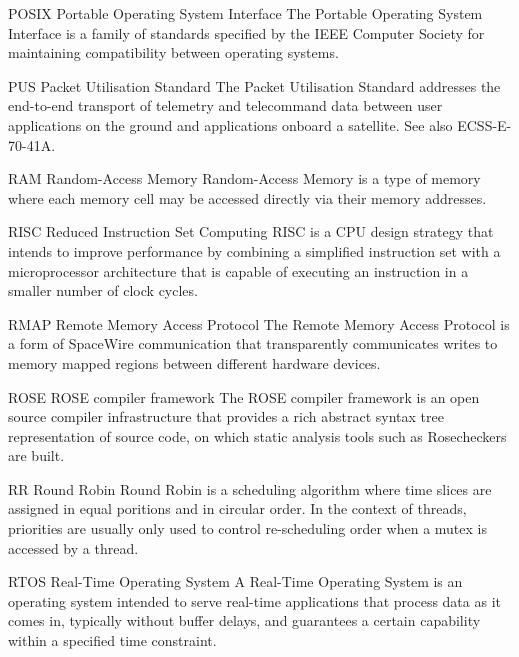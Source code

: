 


  {POSIX}
  {Portable Operating System Interface}
  {The Portable Operating System Interface is a family of standards specified
   by the IEEE Computer Society for maintaining compatibility between
   operating systems.}%

  {PUS}
  {Packet Utilisation Standard}
  {The Packet Utilisation Standard addresses the end-to-end transport of telemetry
   and telecommand data between user applications on the ground and applications
   onboard a satellite. See also ECSS-E-70-41A.}%

%
  {RAM}%
  {Random-Access Memory}%
  {Random-Access Memory is a type of memory where each memory cell may be
   accessed directly via their memory addresses.}%


%
  {RISC}%
  {Reduced Instruction Set Computing}%
  {RISC is a \gls{CPU} design strategy that intends to improve performance by
   combining a simplified instruction set with a microprocessor architecture
   that is capable of executing an instruction in a smaller number of clock
   cycles.}%

%
  {RMAP}%
  {Remote Memory Access Protocol}%
  {The Remote Memory Access Protocol is a form of \gls{SpaceWire} communication
   that transparently communicates writes to memory mapped regions between
   different hardware devices.}%


%
  {ROSE}%
  {ROSE compiler framework}%
  {The ROSE compiler framework is an open source compiler infrastructure that %
   provides a rich abstract syntax tree representation of source code, on which %
   static analysis tools such as Rosecheckers are built.}%

%
  {RR}%
  {Round Robin}%
  {Round Robin is a scheduling algorithm where time slices are assigned in equal
   poritions and in circular order. In the context of threads, priorities are
   usually only used to control re-scheduling order when a mutex is accessed by
   a thread.}%

%
  {RTOS}%
  {Real-Time Operating System}%
  {A Real-Time Operating System is an operating system intended to serve
   real-time applications that process data as it comes in, typically
   without buffer delays, and guarantees a certain capability within a
   specified time constraint.}%

